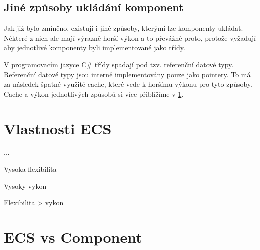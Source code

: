 


\subsection{Jiné způsoby ukládání komponent}
Jak již bylo zmíněno, existují i jiné způsoby, kterými lze komponenty ukládat. Některé z nich ale mají výrazně horší výkon a to převážně proto, protože vyžadují aby jednotlivé komponenty byli implementované jako třídy.

V programovacím jazyce C\# třídy spadají pod tzv. referenční datové typy. Referenční datové typy jsou interně implementovány pouze jako pointery. To má za následek špatné využité cache, které vede k horšímu výkonu pro tyto způsoby. Cache a výkon jednotlivých způsobů si více přiblížíme v \ref{sec:ecs_props}.


\section{Vlastnosti ECS}
\label{sec:ecs_props}
...

Vysoka flexibilita

Vysoky vykon

Flexibilita > vykon

\section{ECS vs Component}


